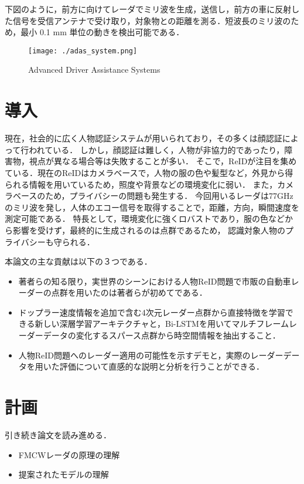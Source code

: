 \documentclass[dvipdfmx]{jsarticle}
\begin{document}
下図のように，前方に向けてレーダでミリ波を生成，送信し，前方の車に反射した信号を受信アンテナで受け取り，対象物との距離を測る．短波長のミリ波のため，最小 0.1 mm 単位の動きを検出可能である．
\begin{figure}[H]
\begin{center}
\texttt{[image: ./adas\_system.png]}
\end{center}
\caption{Advanced Driver Assistance Systems}
\end{figure}

\section{導入}
現在，社会的に広く人物認証システムが用いられており，その多くは顔認証によって行われている．
しかし，顔認証は難しく，人物が非協力的であったり，障害物，視点が異なる場合等は失敗することが多い．
そこで，ReIDが注目を集めている．現在のReIDはカメラベースで，人物の服の色や髪型など，外見から得られる情報を用いているため，照度や背景などの環境変化に弱い．
また，カメラベースのため，プライバシーの問題も発生する．
今回用いるレーダは77GHzのミリ波を発し，人体のエコー信号を取得することで，距離，方向，瞬間速度を測定可能である．
特長として，環境変化に強くロバストであり，服の色などから影響を受けず，最終的に生成されるのは点群であるため，
認識対象人物のプライバシーも守られる．

本論文の主な貢献は以下の３つである．
\begin{itemize}
	\item 著者らの知る限り，実世界のシーンにおける人物ReID問題で市販の自動車レーダーの点群を用いたのは著者らが初めてである．
	\item ドップラー速度情報を追加で含む4次元レーダー点群から直接特徴を学習できる新しい深層学習アーキテクチャと，Bi-LSTMを用いてマルチフレームレーダーデータの変化するスパース点群から時空間情報を抽出すること．
	\item 人物ReID問題へのレーダー適用の可能性を示すデモと，実際のレーダーデータを用いた評価について直感的な説明と分析を行うことができる．
\end{itemize}
\section{計画}
引き続き論文を読み進める．
\begin{itemize}
	\item FMCWレーダの原理の理解
    \item 提案されたモデルの理解
\end{itemize}
\end{document}
